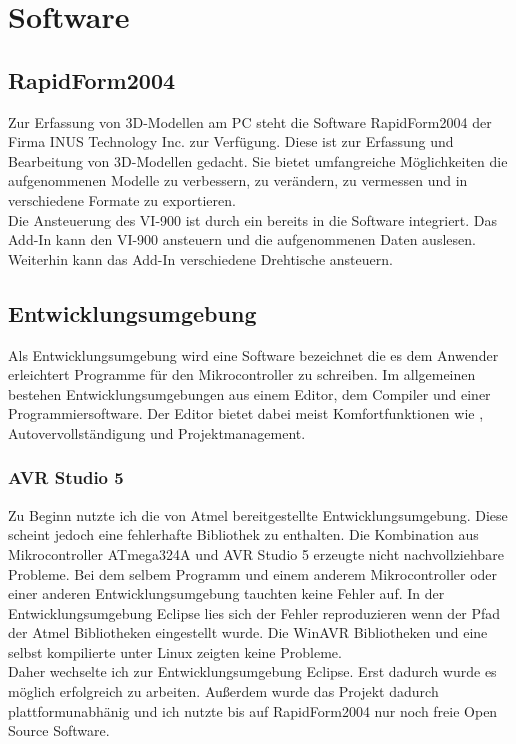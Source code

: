 \chapter{Software}
\label{cha:Software}

\section{RapidForm2004}
\label{sec:RapidForm}
Zur Erfassung von 3D-Modellen am PC steht die Software RapidForm2004 der Firma INUS Technology Inc. zur Verfügung. Diese ist zur Erfassung und Bearbeitung von 3D-Modellen gedacht. Sie bietet umfangreiche Möglichkeiten die aufgenommenen Modelle zu verbessern, zu verändern, zu vermessen und in verschiedene Formate zu exportieren.\\
Die Ansteuerung des VI-900 ist durch ein  bereits in die Software integriert. Das Add-In kann den VI-900 ansteuern und die aufgenommenen Daten auslesen. Weiterhin kann das Add-In verschiedene Drehtische ansteuern.

\section{Entwicklungsumgebung}
\label{sec:Entwicklungsumgebung}
Als Entwicklungsumgebung wird eine Software bezeichnet die es dem Anwender erleichtert Programme für den Mikrocontroller zu schreiben. Im allgemeinen bestehen Entwicklungsumgebungen aus einem Editor, dem Compiler und einer Programmiersoftware. Der Editor bietet dabei meist Komfortfunktionen wie , Autovervollständigung und Projektmanagement.
\subsection{AVR Studio 5}
Zu Beginn nutzte ich die von Atmel bereitgestellte Entwicklungsumgebung. Diese scheint jedoch eine fehlerhafte Bibliothek zu enthalten. Die Kombination aus Mikrocontroller ATmega324A und AVR Studio 5 erzeugte nicht nachvollziehbare Probleme. Bei dem selbem Programm und einem anderem Mikrocontroller oder einer anderen Entwicklungsumgebung tauchten keine Fehler auf.
In der Entwicklungsumgebung Eclipse lies sich der Fehler reproduzieren wenn der Pfad der Atmel Bibliotheken eingestellt wurde. Die WinAVR Bibliotheken und eine selbst kompilierte  unter Linux zeigten keine Probleme.\\
Daher wechselte ich zur  Entwicklungsumgebung Eclipse. Erst dadurch wurde es möglich erfolgreich zu arbeiten. Außerdem wurde das Projekt dadurch plattformunabhänig und ich nutzte bis auf RapidForm2004 nur noch freie Open Source Software.\\

